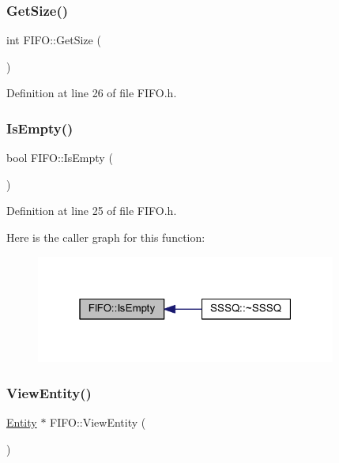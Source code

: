\subsubsection{\texorpdfstring{Get\+Size()}{GetSize()}}
{\footnotesize\ttfamily int F\+I\+F\+O\+::\+Get\+Size (\begin{DoxyParamCaption}{ }\end{DoxyParamCaption})\hspace{0.3cm}{\ttfamily [inline]}}



Definition at line 26 of file F\+I\+F\+O.\+h.

\mbox{\label{class_f_i_f_o_a8dd1be7a3e1ada7cafe5fc85a7211408}} 
\subsubsection{\texorpdfstring{Is\+Empty()}{IsEmpty()}}
{\footnotesize\ttfamily bool F\+I\+F\+O\+::\+Is\+Empty (\begin{DoxyParamCaption}{ }\end{DoxyParamCaption})\hspace{0.3cm}{\ttfamily [inline]}}



Definition at line 25 of file F\+I\+F\+O.\+h.

Here is the caller graph for this function\+:\nopagebreak
\begin{figure}[H]
\begin{center}
\leavevmode
\includegraphics[width=280pt]{class_f_i_f_o_a8dd1be7a3e1ada7cafe5fc85a7211408_icgraph}
\end{center}
\end{figure}
\mbox{\label{class_f_i_f_o_a4ce6b8e9afc3c29c9a7f1a4e0fdc81ec}} 
\subsubsection{\texorpdfstring{View\+Entity()}{ViewEntity()}}
{\footnotesize\ttfamily \hyperlink{class_entity}{Entity} $\ast$ F\+I\+F\+O\+::\+View\+Entity (\begin{DoxyParamCaption}{ }\end{DoxyParamCaption})}



